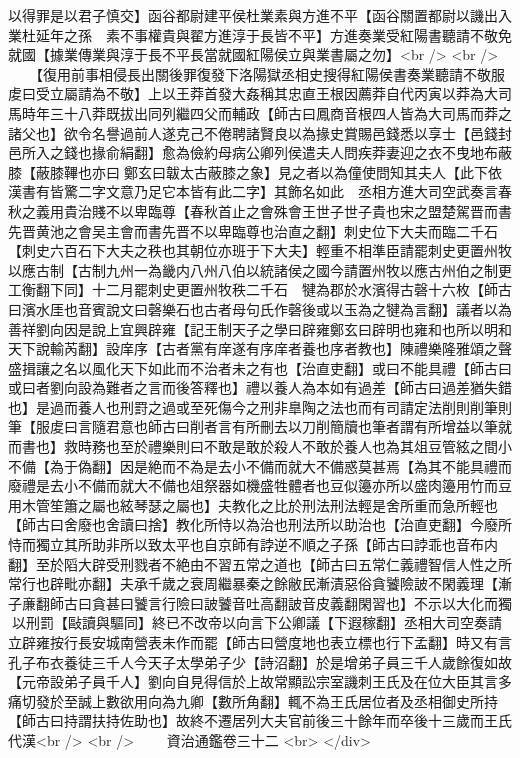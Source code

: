 以得罪是以君子慎交】函谷都尉建平侯杜業素與方進不平【函谷關置都尉以譏出入業杜延年之孫　素不事權貴與翟方進淳于長皆不平】方進奏業受紅陽書聽請不敬免就國【據業傳業與淳于長不平長當就國紅陽侯立與業書屬之勿】<br />
<br />
　　【復用前事相侵長出關後罪復發下洛陽獄丞相史搜得紅陽侯書奏業聽請不敬服䖍曰受立屬請為不敬】上以王莽首發大姦稱其忠直王根因薦莽自代丙寅以莽為大司馬時年三十八莽既拔出同列繼四父而輔政【師古曰鳳商音根四人皆為大司馬而莽之諸父也】欲令名譽過前人遂克己不倦聘諸賢良以為掾史賞賜邑錢悉以享士【邑錢封邑所入之錢也掾俞絹翻】愈為儉約母病公卿列侯遣夫人問疾莽妻迎之衣不曳地布蔽膝【蔽膝鞸也亦曰鄭玄曰韍太古蔽膝之象】見之者以為僮使問知其夫人【此下依漢書有皆驚二字文意乃足它本皆有此二字】其飾名如此　丞相方進大司空武奏言春秋之義用貴治賤不以卑臨尊【春秋首止之會殊會王世子世子貴也宋之盟楚駕晋而書先晋黄池之會吴主會而書先晋不以卑臨尊也治直之翻】刺史位下大夫而臨二千石【刺史六百石下大夫之秩也其朝位亦班于下大夫】輕重不相準臣請罷刺史更置州牧以應古制【古制九州一為畿内八州八伯以統諸侯之國今請置州牧以應古州伯之制更工衡翻下同】十二月罷刺史更置州牧秩二千石　犍為郡於水濱得古磬十六枚【師古曰濱水厓也音賓說文曰磬樂石也古者母句氏作磬後或以玉為之犍為言翻】議者以為善祥劉向因是說上宜興辟雍【記王制天子之學曰辟雍鄭玄曰辟明也雍和也所以明和天下說輸芮翻】設庠序【古者黨有庠遂有序庠者養也序者教也】陳禮樂隆雅頌之聲盛揖讓之名以風化天下如此而不治者未之有也【治直吏翻】或曰不能具禮【師古曰或曰者劉向設為難者之言而後答釋也】禮以養人為本如有過差【師古曰過差猶失錯也】是過而養人也刑罸之過或至死傷今之刑非臯陶之法也而有司請定法削則削筆則筆【服䖍曰言隨君意也師古曰削者言有所刪去以刀削簡牘也筆者謂有所增益以筆就而書也】救時務也至於禮樂則曰不敢是敢於殺人不敢於養人也為其俎豆管絃之間小不備【為于偽翻】因是絶而不為是去小不備而就大不備惑莫甚焉【為其不能具禮而廢禮是去小不備而就大不備也俎祭器如機盛牲體者也豆似籩亦所以盛肉籩用竹而豆用木管笙簫之屬也絃琴瑟之屬也】夫教化之比於刑法刑法輕是舍所重而急所輕也【師古曰舍廢也舍讀曰捨】教化所恃以為治也刑法所以助治也【治直吏翻】今廢所恃而獨立其所助非所以致太平也自京師有誖逆不順之子孫【師古曰誖乖也音布内翻】至於䧟大辟受刑戮者不絶由不習五常之道也【師古曰五常仁義禮智信人性之所常行也辟毗亦翻】夫承千歲之衰周繼暴秦之餘敝民漸漬惡俗貪饕險詖不閑義理【漸子亷翻師古曰貪甚曰饕言行險曰詖饕音吐高翻詖音皮義翻閑習也】不示以大化而獨以刑罰【敺讀與驅同】終已不改帝以向言下公卿議【下遐稼翻】丞相大司空奏請立辟雍按行長安城南營表未作而罷【師古曰營度地也表立標也行下孟翻】時又有言孔子布衣養徒三千人今天子太學弟子少【詩沼翻】於是增弟子員三千人歲餘復如故【元帝設弟子員千人】劉向自見得信於上故常顯訟宗室譏刺王氏及在位大臣其言多痛切發於至誠上數欲用向為九卿【數所角翻】輒不為王氏居位者及丞相御史所持【師古曰持謂扶持佐助也】故終不遷居列大夫官前後三十餘年而卒後十三歲而王氏代漢<br />
<br />
　　資治通鑑卷三十二  <br>
   </div> 

